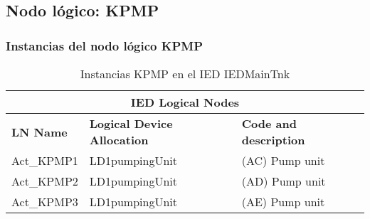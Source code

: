 
\subsection{Nodo l\'ogico: 			 KPMP}

    \subsubsection{Instancias del nodo l\'ogico KPMP}
    \begin{table}[H]
    \begin{center}
    \begin{tabular}{|l|l|p{6.8cm}|}
            \hline
            \multicolumn{3}{|c|}{\cellcolor[gray]{0.8} \textbf{IED Logical Nodes} } \\
            \hline
            \textbf{LN Name} & \textbf{Logical Device Allocation} & \textbf{Code and description} \\
            \hline
            Act\_KPMP1 & LD1pumpingUnit & (AC) Pump unit \\
            \hline
            Act\_KPMP2 & LD1pumpingUnit & (AD) Pump unit \\
            \hline
            Act\_KPMP3 & LD1pumpingUnit & (AE) Pump unit \\
            \hline
    \end{tabular}
    \caption{Instancias KPMP en el IED IEDMainTnk}
    \label{table:lnInstKPMPa}
    \end{center}
    \end{table}
    
    
    
